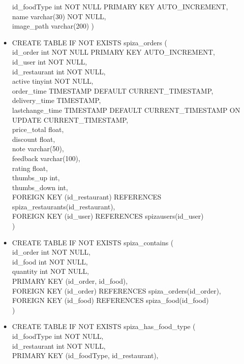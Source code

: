 \documentclass[12pt]{scrartcl}
\begin{document}
\begin{itemize}
    id\_foodType int NOT NULL PRIMARY KEY AUTO\_INCREMENT,\\
    name varchar(30) NOT NULL,\\
    image\_path varchar(200)
    )
    \item[] CREATE TABLE IF NOT EXISTS spiza\_orders  (\\
    id\_order int NOT NULL PRIMARY KEY AUTO\_INCREMENT,\\
    id\_user int NOT NULL,\\
    id\_restaurant int NOT NULL,\\
    active tinyint NOT NULL,\\
    order\_time TIMESTAMP DEFAULT CURRENT\_TIMESTAMP,\\
    delivery\_time TIMESTAMP,\\
    lastchange\_time TIMESTAMP DEFAULT CURRENT\_TIMESTAMP ON UPDATE CURRENT\_TIMESTAMP,\\
    price\_total float,\\ 
    discount float,\\
    note varchar(50),\\
    feedback varchar(100),\\
    rating float,\\
    thumbs\_up int,\\
    thumbs\_down int, \\
    FOREIGN KEY (id\_restaurant) REFERENCES spiza\_restaurants(id\_restaurant),\\
    FOREIGN KEY (id\_user) REFERENCES spiza\textunderscore users(id\_user)\\
    )
    \item[] CREATE TABLE IF NOT EXISTS spiza\_contains (\\
    id\_order int NOT NULL,\\
    id\_food int NOT NULL,\\
    quantity int NOT NULL,\\
    PRIMARY KEY (id\_order, id\_food),\\
    FOREIGN KEY (id\_order) REFERENCES spiza\_orders(id\_order),\\
    FOREIGN KEY (id\_food) REFERENCES spiza\_food(id\_food)\\
    )
    \item[] CREATE TABLE IF NOT EXISTS spiza\_has\_food\_type (\\
    id\_foodType int NOT NULL,\\
    id\_restaurant int NOT NULL,\\
    PRIMARY KEY (id\_foodType, id\_restaurant),\\

\end{itemize}
\end{document}
